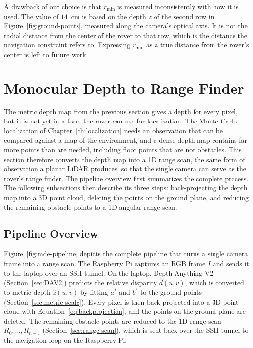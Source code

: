 A drawback of our choice is that $r_{\min}$ is measured inconsistently with how it is used. The
value of $14$~cm is based on the depth $z$ of the second row in Figure~\ref{fig:ground-points},
measured along the camera's optical axis. It is not the radial distance from the center of the rover to that row,
which is the distance the navigation constraint refers to. 
Expressing $r_{\min}$ as a true
distance from the rover's center is left to future work.


\section{Monocular Depth to Range Finder}

\label{sec:mde-to-range}

The metric depth map from the previous section gives a depth for every pixel, but it is not yet in
a form the rover can use for localization. The Monte Carlo localization of
Chapter~\ref{ch:localization} needs an observation that can be compared against a map of the
environment, and a dense depth map contains far more points than are needed, including floor
points that are not obstacles. This section therefore converts the depth map into a 1D range
scan, the same form of observation a planar LiDAR produces, so that the single camera can serve
as the rover's range finder. The pipeline overview first summarizes the complete process. The
following subsections then describe its three steps: back-projecting the depth map into a 3D
point cloud, deleting the points on the ground plane, and reducing the remaining obstacle points
to a 1D angular range scan.


\subsection{Pipeline Overview}
\label{sec:mde-pipeline}

Figure~\ref{fig:mde-pipeline} depicts the complete pipeline that turns a single camera frame into
a range scan. The Raspberry Pi captures an RGB frame $I$ and sends it to the laptop over an SSH
tunnel. On the laptop, Depth Anything V2 (Section~\ref{sec:DAV2}) predicts the relative disparity
$\hat{d}(u,v)$, which is converted to metric depth $\hat{z}(u,v)$ by fitting $a^{*}$ and $b^{*}$ to
the ground points (Section~\ref{sec:metric-scale}). Every pixel is then back-projected into a 3D
point cloud with Equation~\ref{eq:backprojection}, and the points on the ground plane are
deleted. The remaining obstacle points are reduced to the 1D range scan
$R_0, \dots, R_{n-1}$ (Section~\ref{sec:range-scan}), which is sent back over the SSH tunnel to the
navigation loop on the Raspberry Pi.

